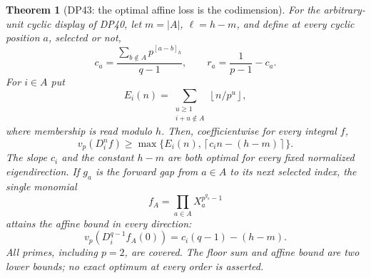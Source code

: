 \documentclass[11pt,a4paper]{article}
\newtheorem{theorem}{Theorem}[section]
\theoremstyle{definition}\newtheorem{remark}[theorem]{Remark}
\newcommand{\vp}{v_p}\newcommand{\dR}{\mathrm{dR}}\newcommand{\crys}{\mathrm{crys}}
\newcommand{\ceil}[1]{\left\lceil #1\right\rceil}\newcommand{\floor}[1]{\left\lfloor #1\right\rfloor}
\begin{document}
\begin{theorem}[DP43: the optimal affine loss is the codimension]\label{DP43}
For the arbitrary-unit cyclic display of DP40, let $m=|A|$, $\ell=h-m$, and define at every cyclic position $a$, selected or not,
\[
 c_a=\frac{\sum_{b\notin A}p^{[a-b]_h}}{q-1},\qquad
 r_a=\frac1{p-1}-c_a.
\]
For $i\in A$ put
\[
 E_i(n)=\sum_{\substack{u\ge1\\i+u\notin A}}
                  \floor{n/p^u},
\]
where membership is read modulo $h$. Then, coefficientwise for every integral $f$,
\begin{equation}\label{eq:cyclicaffine}
 \vp(D_i^nf)\ge
 \max\{E_i(n),\ceil{c_in-(h-m)}\}.
\end{equation}
The slope $c_i$ and the constant $h-m$ are both optimal for every fixed normalized eigendirection. If $g_a$ is the forward gap from $a\in A$ to its next selected index, the single monomial
\[
 f_A=\prod_{a\in A}X_a^{p^{g_a}-1}
\]
attains the affine bound in every direction:
\[
 \vp(D_i^{q-1}f_A(0))=c_i(q-1)-(h-m).
\]
All primes, including $p=2$, are covered. The floor sum and affine bound are two lower bounds; no exact optimum at every order is asserted.
\end{theorem}
\end{document}
